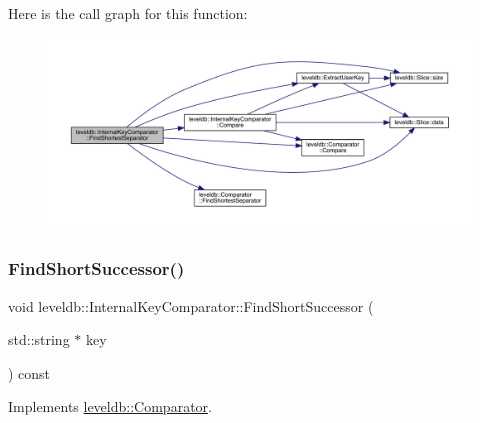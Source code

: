 Here is the call graph for this function\+:
\nopagebreak
\begin{figure}[H]
\begin{center}
\leavevmode
\includegraphics[width=350pt]{classleveldb_1_1_internal_key_comparator_a876984ae99b1404b4074be4d92cab421_cgraph}
\end{center}
\end{figure}
\mbox{\label{classleveldb_1_1_internal_key_comparator_a221a28a524474834b2cba5c3be84cb13}} 
\subsubsection{\texorpdfstring{FindShortSuccessor()}{FindShortSuccessor()}}
{\footnotesize\ttfamily void leveldb\+::\+Internal\+Key\+Comparator\+::\+Find\+Short\+Successor (\begin{DoxyParamCaption}\item[{std\+::string $\ast$}]{key }\end{DoxyParamCaption}) const\hspace{0.3cm}{\ttfamily [virtual]}}



Implements \mbox{\hyperlink{structleveldb_1_1_comparator_a49751dd906595633161dfad943d24b3b}{leveldb\+::\+Comparator}}.

